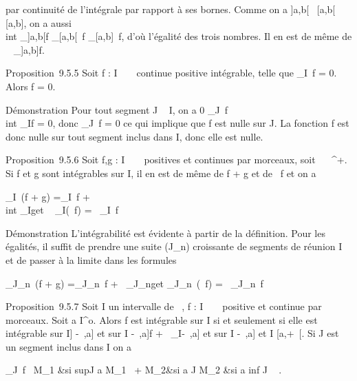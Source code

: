 \documentclass[]{article}
\begin{document}
par continuité de l'intégrale par rapport à ses bornes. Comme on a
]a,b[\subset~ [a,b[\subset~ [a,b], on a aussi \\int
 _]a,b[f \leq\int  _[a,b[~f
\leq\int  _[a,b]~f, d'où l'égalité des
trois nombres. Il en est de même de \int ~
_]a,b]f.

Proposition~9.5.5 Soit f : I \rightarrow~ ~ continue positive intégrable, telle que
\int  _I~f = 0. Alors f = 0.

Démonstration Pour tout segment J \subset~ I, on a 0
\leq\int  _J~f \leq\\int
 _If = 0, donc \int  _J~f = 0 ce
qui implique que f est nulle sur J. La fonction f est donc nulle sur
tout segment inclus dans I, donc elle est nulle.

Proposition~9.5.6 Soit f,g : I \rightarrow~ ~ positives et continues par morceaux,
soit \alpha~ \in {}~^+. Si f et g sont intégrables sur I, il en est de
même de f + g et de \alpha~f et on a

\int  _I~(f + g)
=\int  _I~f +\\int
 _Ig\text et \int ~
_I(\alpha~f) = \alpha~\int  _I~f

Démonstration L'intégrabilité est évidente à partir de la définition.
Pour les égalités, il suffit de prendre une suite (J_n)
croissante de segments de réunion I et de passer à la limite dans les
formules

\int  _J_n~(f + g)
=\int  _J_n~f
+\int ~
_J_ng\text et
\int  _J_n~(\alpha~f) =
\alpha~\int  _J_n~f

Proposition~9.5.7 Soit I un intervalle de ~, f : I \rightarrow~ ~ positive et
continue par morceaux. Soit a \in I^o. Alors f est intégrable
sur I si et seulement si elle est intégrable sur I\bigcap] -\infty~,a] et sur I
\bigcap [a,+\infty~[. Dans ce cas,

\int  _I~f =\\int
 _I\bigcap]-\infty~,a]f +\int ~
_I\bigcap[a,+\infty~[

Démonstration Si f est intégrable sur I, elle est intégrable sur tout
sous intervalle de I et donc sur I\bigcap] -\infty~,a] et sur I \bigcap [a,+\infty~[.
Inversement, si f est intégrable sur ces deux sous intervalles, soit
M_1 et M_2 les majorants des intégrales sur les sous
segments de I\bigcap] -\infty~,a] et I \bigcap [a,+\infty~[. Si J est un segment inclus
dans I on a

\int  _J~f \leq\left
\ \cases M_1 &si
supJ \leq a \cr M_1~ +
M_2&si a \in J \cr M_2 &si a
\leq inf J ~ \right .
\end{document}
